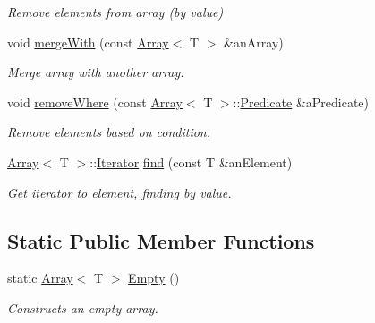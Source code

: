 \begin{DoxyCompactItemize}
\begin{DoxyCompactList}\small\item\em Remove elements from array (by value) \end{DoxyCompactList}\item 
void \hyperlink{classostk_1_1core_1_1ctnr_1_1_array_a7b436feb27e4b0c81cf218bc61b6f5f2}{merge\+With} (const \hyperlink{classostk_1_1core_1_1ctnr_1_1_array}{Array}$<$ T $>$ \&an\+Array)
\begin{DoxyCompactList}\small\item\em Merge array with another array. \end{DoxyCompactList}\item 
void \hyperlink{classostk_1_1core_1_1ctnr_1_1_array_aa4cc38300dac06710e281a3bb7fae86d}{remove\+Where} (const \hyperlink{classostk_1_1core_1_1ctnr_1_1_array}{Array}$<$ T $>$\+::\hyperlink{classostk_1_1core_1_1ctnr_1_1_array_a7c04a98dd10cd625acf96addd312d0af}{Predicate} \&a\+Predicate)
\begin{DoxyCompactList}\small\item\em Remove elements based on condition. \end{DoxyCompactList}\item 
\hyperlink{classostk_1_1core_1_1ctnr_1_1_array}{Array}$<$ T $>$\+::\hyperlink{classostk_1_1core_1_1ctnr_1_1_array_accf81dc56e553dad2ce7b72802836c46}{Iterator} \hyperlink{classostk_1_1core_1_1ctnr_1_1_array_abff2b3ec6c0a3345568ddd7c19ff5b86}{find} (const T \&an\+Element)
\begin{DoxyCompactList}\small\item\em Get iterator to element, finding by value. \end{DoxyCompactList}\end{DoxyCompactItemize}
\subsection*{Static Public Member Functions}
\begin{DoxyCompactItemize}
\item 
static \hyperlink{classostk_1_1core_1_1ctnr_1_1_array}{Array}$<$ T $>$ \hyperlink{classostk_1_1core_1_1ctnr_1_1_array_a0d6dc521540ee128b43a66663c9f3dd8}{Empty} ()
\begin{DoxyCompactList}\small\item\em Constructs an empty array. \end{DoxyCompactList}\end{DoxyCompactItemize}
